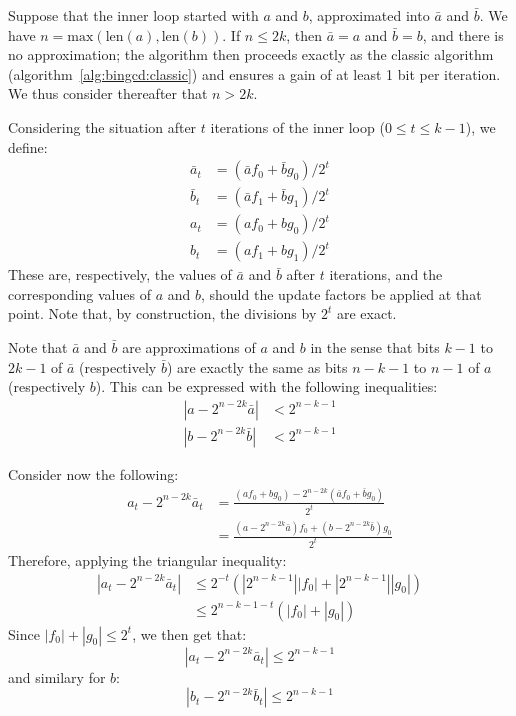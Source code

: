 \documentclass{llncs}
\newcommand{\bitlength}{\text{len}}
\begin{document}
Suppose that the inner loop started with $a$ and $b$, approximated into
$\bar a$ and $\bar b$. We have $n = \text{max}(\bitlength(a),
\bitlength(b))$. If $n \leq 2k$, then $\bar a = a$ and $\bar b = b$, and
there is no approximation; the algorithm then proceeds exactly as the
classic algorithm (algorithm~\ref{alg:bingcd:classic}) and ensures a
gain of at least 1 bit per iteration. We thus consider thereafter that
$n > 2k$.

Considering the situation after $t$ iterations of the inner loop
($0\leq t\leq k-1$), we define:
\begin{align*}
    \bar a_t &= (\bar a f_0 + \bar b g_0)/2^t \\
    \bar b_t &= (\bar a f_1 + \bar b g_1)/2^t \\
    a_t &= (a f_0 + b g_0)/2^t \\
    b_t &= (a f_1 + b g_1)/2^t
\end{align*}
These are, respectively, the values of $\bar a$ and $\bar b$ after $t$
iterations, and the corresponding values of $a$ and $b$, should the
update factors be applied at that point. Note that, by construction, the
divisions by $2^t$ are exact.

Note that $\bar a$ and $\bar b$ are approximations of $a$ and $b$ in the
sense that bits $k-1$ to $2k-1$ of $\bar a$ (respectively $\bar b$) are
exactly the same as bits $n-k-1$ to $n-1$ of $a$ (respectively $b$). This
can be expressed with the following inequalities:
\begin{align*}
    |a - 2^{n-2k} \bar a| &< 2^{n-k-1} \\
    |b - 2^{n-2k} \bar b| &< 2^{n-k-1}
\end{align*}

Consider now the following:
\begin{align*}
    a_t - 2^{n-2k} \bar a_t
        &= \frac{(af_0 + bg_0) - 2^{n-2k}(\bar a f_0 + \bar b g_0)}{2^t} \\
        &= \frac{(a - 2^{n-2k} \bar a)f_0 + (b - 2^{n-2k} \bar b)g_0}{2^t}
\end{align*}
Therefore, applying the triangular inequality:
\begin{align*}
    |a_t - 2^{n-2k} \bar a_t|
        &\leq 2^{-t} (|2^{n-k-1}| |f_0| + |2^{n-k-1}| |g_0|) \\
        &\leq 2^{n-k-1-t} (|f_0| + |g_0|)
\end{align*}
Since $|f_0| + |g_0| \leq 2^t$, we then get that:
\begin{equation*}
    |a_t - 2^{n-2k} \bar a_t| \leq 2^{n-k-1}
\end{equation*}
and similary for $b$:
\begin{equation*}
    |b_t - 2^{n-2k} \bar b_t| \leq 2^{n-k-1}
\end{equation*}
\end{document}
